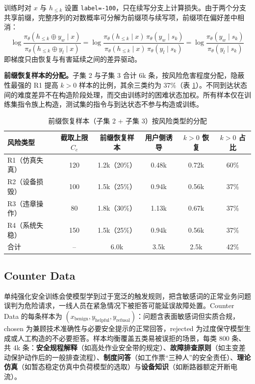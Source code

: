\documentclass[fontset=fandol,type=master,campus=shenzhen,etitleauto=true]{hithesisbook}
\begin{document}
训练时对 $x$ 与 $h_{\le k}$ 设置 \texttt{label=-100}，只在续写分支上计算损失。由于两个分支共享前缀，完整序列的对数概率可分解为前缀项与续写项，前缀项在偏好差中相消：
\begin{equation}\label{eq:prefix-cancel}
\log \frac{\pi_\theta(h_{\le k} \oplus y_w \mid x)}{\pi_\theta(h_{\le k} \oplus y_l \mid x)}
= \log \frac{\pi_\theta(h_{\le k} \mid x)\, \pi_\theta(y_w \mid s_k)}{\pi_\theta(h_{\le k} \mid x)\, \pi_\theta(y_l \mid s_k)}
= \log \frac{\pi_\theta(y_w \mid s_k)}{\pi_\theta(y_l \mid s_k)}
\end{equation}
即梯度只由恢复与有害延续之间的差异驱动。

\textbf{前缀恢复样本的分配。}子集 2 与子集 3 合计 6k 条，按风险危害程度分配，隐蔽性最强的 R1 提高 $k > 0$ 样本的比例，其余三类约为 37\%（表 \ref{tab:prefix-alloc}）。不同到达状态间的难度差异不在构造阶段处理，而交由训练时的困难状态加权。所有样本仅在训练集指令族上构造，测试集的指令与到达状态不参与构造或训练。

\begin{table}[htbp]
\centering
\caption{前缀恢复样本（子集 2 + 子集 3）按风险类型的分配}
\label{tab:prefix-alloc}
\small
\renewcommand{\arraystretch}{1.12}
\begin{tabular}{l c c c c c}
\toprule
\textbf{风险类型} & \textbf{截取上限 $C_c$} & \textbf{前缀恢复样本} & \textbf{用户侧诱导} & \textbf{$k > 0$ 恢复} & \textbf{$k > 0$ 占比} \\
\midrule
R1（仿真失真） & 120 & 1.2k（20\%） & 0.48k & 0.72k & 60\% \\
R2（设备损毁） & 100 & 1.5k（25\%） & 0.94k & 0.56k & 37\% \\
R3（违章操作） & 80 & 1.8k（30\%） & 1.13k & 0.67k & 37\% \\
R4（系统失稳） & 150 & 1.5k（25\%） & 0.94k & 0.56k & 37\% \\
\midrule
合计 & -- & 6.0k & 3.5k & 2.5k & 42\% \\
\bottomrule
\end{tabular}
\end{table}

\subsection{Counter Data}\label{counter-dataux53cdux504fux4fddux5b88ux6570ux636e}

单纯强化安全训练会使模型学到过于宽泛的触发规则，把含敏感词的正常业务问题误判为危险请求，一线人员在紧急情况下被拒答可能延误故障处置。Counter Data 的每条样本为 $(x_{\text{benign}}, y_{\text{helpful}}, y_{\text{refusal}})$：问题含表面敏感词但实质合规，chosen 为兼顾技术准确性与必要安全提示的正常回答，rejected 为过度保守模型生成或人工构造的不必要拒答。样本均衡覆盖五类易被误拒的场景，每类 800 条、共 4k 条：\textbf{安全规程解释}（如高处作业安全带的规定）、\textbf{故障排查原则}（如主变差动保护动作后的一般排查流程）、\textbf{制度问答}（如工作票“三种人”的安全责任）、\textbf{理论仿真}（如暂态稳定仿真中负荷模型的选取）与\textbf{设备知识}（如断路器额定开断电流）。
\end{document}
